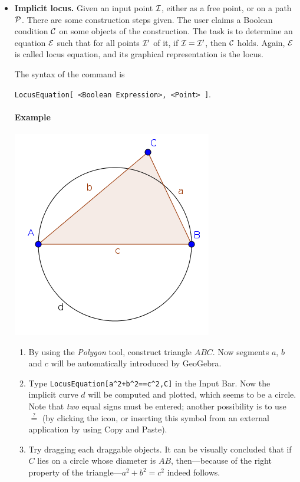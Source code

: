 \documentclass{article}
\begin{document}
\begin{itemize}
\item \textbf{Implicit locus.}
Given an input point $\cal I$, either as a free point, or on a path $\cal P$. There are some construction steps given. The user claims a Boolean condition $\cal C$ on some objects of the construction. The task is to determine an equation $\cal E$ such that for all points $\cal{I}'$ of it, if $\cal{I}=\cal{I}'$, then $\cal{C}$ holds. Again, $\cal{E}$ is called locus equation, and its graphical representation is the locus.

The syntax of the command is
\begin{center}
    \texttt{LocusEquation[ <Boolean Expression>, <Point> ]}.
\end{center}


\paragraph{Example}
\begin{center}
\includegraphics[scale=0.5]{LocusEquation-example-implicit}
\end{center}
\begin{enumerate}
    \item By using the \textit{Polygon} tool, construct triangle $ABC$. Now segments $a$, $b$ and $c$ will be automatically introduced by GeoGebra.
    \item Type \texttt{LocusEquation[a\^{}2+b\^{}2==c\^{}2,C]} in the Input Bar. Now the implicit curve $d$ will be computed and plotted, which seems to be a circle.
    Note that \textit{two} equal signs must be entered; another possibility is to use $\stackrel{?}{=}$ (by clicking the \framebox{$\alpha$} icon, or inserting this symbol from an external application by using Copy and Paste).
    \item Try dragging each draggable objects. It can be visually concluded that if $C$ lies on a circle whose diameter is $AB$, then---because of the right property of the triangle---$a^2+b^2=c^2$ indeed follows.
\end{enumerate}

\end{itemize}
\end{document}
